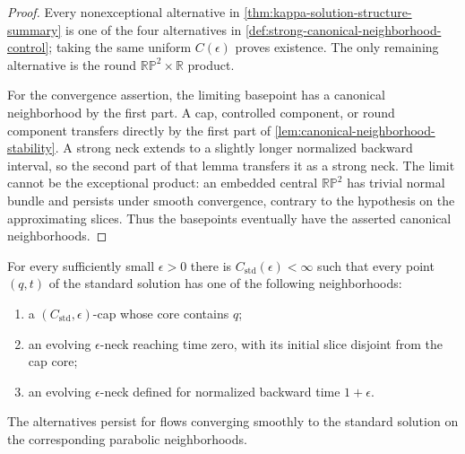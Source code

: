 \begin{proof}
Every nonexceptional alternative in
\ref{thm:kappa-solution-structure-summary} is one of the four alternatives
in \ref{def:strong-canonical-neighborhood-control}; taking the same uniform
$C(\epsilon)$ proves existence.  The only remaining alternative is the round
$\mathbb{RP}^2\times\mathbb R$ product.

For the convergence assertion, the limiting basepoint has a canonical
neighborhood by the first part.  A cap, controlled component, or round
component transfers directly by the first part of
\ref{lem:canonical-neighborhood-stability}.  A strong neck extends to a
slightly longer normalized backward interval, so the second part of that
lemma transfers it as a strong neck.  The limit cannot be the exceptional
product: an embedded central $\mathbb{RP}^2$ has trivial normal bundle and
persists under smooth convergence, contrary to the hypothesis on the
approximating slices.  Thus the basepoints eventually have the asserted
canonical neighborhoods.
\end{proof}

\begin{theorem}
\label{thm:standard-solution-canonical-neighborhoods}
\notready
For every sufficiently small $\epsilon>0$ there is
$C_{\mathrm{std}}(\epsilon)<\infty$ such that every point $(q,t)$ of the
standard solution has one of the following neighborhoods:
\begin{enumerate}
\item a $(C_{\mathrm{std}},\epsilon)$-cap whose core contains $q$;
\item an evolving $\epsilon$-neck reaching time zero, with its initial slice
      disjoint from the cap core;
\item an evolving $\epsilon$-neck defined for normalized backward time
      $1+\epsilon$.
\end{enumerate}
The alternatives persist for flows converging smoothly to the standard
solution on the corresponding parabolic neighborhoods.
\end{theorem}

